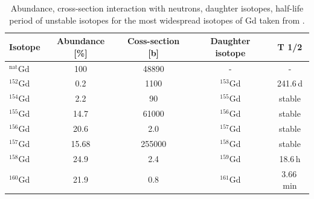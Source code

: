 \begin{table}[!h]
\centering
\begin{tabular}{lcccc}  
\toprule
Isotope             & Abundance [\%] & Coss-section [b] & Daughter isotope & T 1/2      \\
\midrule
$^{\textrm{nat}}$Gd & 100            & 48890            & -                & -          \\
$^{152}$Gd          & 0.2            & 1100             & $^{153}$Gd       & 241.6\,d   \\
$^{154}$Gd          & 2.2            & 90               & $^{155}$Gd       & stable     \\
$^{155}$Gd          & 14.7           & 61000            & $^{156}$Gd       & stable     \\
$^{156}$Gd          & 20.6           & 2.0              & $^{157}$Gd       & stable     \\
$^{157}$Gd          & 15.68          & 255000           & $^{158}$Gd       & stable     \\
$^{158}$Gd          & 24.9           & 2.4              & $^{159}$Gd       & 18.6\,h    \\
$^{160}$Gd          & 21.9           & 0.8              & $^{161}$Gd       & 3.66\,min  \\
\bottomrule  
\end{tabular}
\caption{Abundance, cross-section interaction with neutrons, daughter isotopes, half-life period of unstable isotopes for the most widespread isotopes of Gd taken from \cite{Abdushukurov_2010}.}
\label{tab:gdTable}
\end{table}

